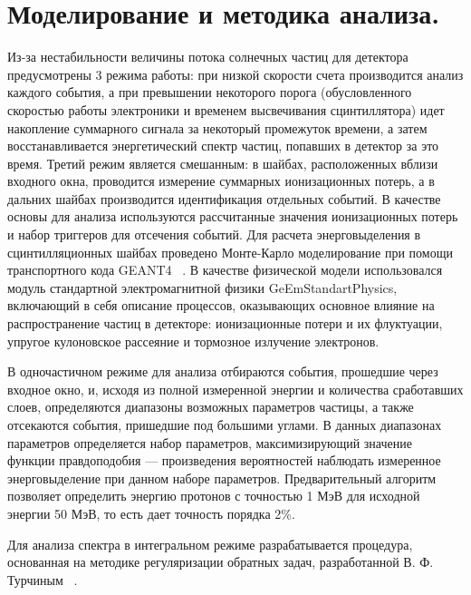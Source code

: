 \documentclass[12pt, a4paper, notitlepage, onecolumn]{article}
\begin{document}
\section*{Моделирование и методика анализа.}
Из-за нестабильности величины потока солнечных частиц для детектора предусмотрены 3 режима работы: при низкой скорости счета производится анализ каждого события, а при превышении некоторого порога (обусловленного скоростью работы электроники и временем высвечивания сцинтиллятора) идет накопление суммарного сигнала за некоторый промежуток времени, а затем восстанавливается энергетический спектр частиц, попавших в детектор за это время. Третий режим является смешанным: в шайбах, расположенных вблизи входного окна, проводится измерение суммарных ионизационных потерь, а в дальних шайбах производится идентификация отдельных событий. В качестве основы для анализа используются рассчитанные значения ионизационных потерь и набор триггеров для отсечения событий. Для расчета энерговыделения в сцинтилляционных шайбах проведено Монте-Карло моделирование при помощи транспортного кода GEANT4 ~\cite{ALLISON2016186}.  В качестве физической модели использовался модуль стандартной электромагнитной физики GeEmStandartPhysics, включающий в себя описание процессов, оказывающих основное влияние на распространение частиц в детекторе: ионизационные потери и их флуктуации, упругое кулоновское рассеяние и тормозное излучение электронов.

В одночастичном режиме для анализа отбираются события, прошедшие через входное окно, и, исходя из полной измеренной энергии и количества сработавших слоев, определяются диапазоны возможных параметров частицы, а также отсекаются события, пришедшие под большими углами. В данных диапазонах параметров определяется набор параметров, максимизирующий значение функции правдоподобия --- произведения вероятностей наблюдать измеренное энерговыделение при данном наборе параметров. Предварительный алгоритм позволяет определить энергию протонов с точностью 1 МэВ для исходной энергии 50 МэВ, то есть дает точность порядка 2\%.

Для анализа спектра в интегральном режиме разрабатывается процедура, основанная на методике регуляризации обратных задач, разработанной В. Ф. Турчиным ~\cite{Turchin-epf}. 
\end{document}
